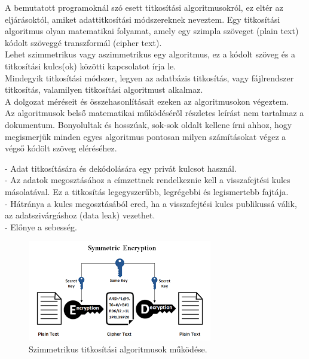 
A bemutatott programoknál szó esett titkosítási algoritmusokról, ez eltér az eljárásoktól, amiket adattitkosítási módszereknek neveztem. Egy titkosítási algoritmus olyan matematikai folyamat, amely egy szimpla szöveget (plain text) kódolt szöveggé transzformál (cipher text).
\\ Lehet szimmetrikus vagy aszimmetrikus egy algoritmus, ez a kódolt szöveg és a titkosítási kulcs(ok) közötti kapcsolatot írja le.
\vspace{5pt}\\Mindegyik titkosítási módszer, legyen az adatbázis titkosítás, vagy fájlrendszer titkosítás, valamilyen titkosítási algoritmust alkalmaz.
\\A dolgozat méréseit és összehasonlításait ezeken az algoritmusokon végeztem.
\vspace{5pt}\\Az algoritmusok belső matematikai működéséről részletes leírást nem tartalmaz a dokumentum. Bonyolultak és hosszúak, sok-sok oldalt kellene írni ahhoz, hogy megismerjük minden egyes algoritmus pontosan milyen számításokat végez a végső kódölt szöveg eléréséhez.
 
\noindent - Adat titkosítására és dekódolására egy privát kulcsot használ.
\\- Az adatok megosztásához a címzettnek rendelkeznie kell a visszafejtési kulcs másolatával. Ez a titkosítás legegyszerűbb, legrégebbi és legismertebb fajtája.
\\- Hátránya a kulcs megosztásából ered, ha a visszafejtési kulcs publikussá válik, az adatszivárgáshoz (data leak) vezethet.
\\- Előnye a sebesség. \newline

\begin{figure}[h]
	\centering
	\includegraphics[scale=0.7]{images/sym.png}
	\caption{Szimmetrikus titkosítási algoritmusok működése.}
	\label{fig:sym_encryptino}
\end{figure}

